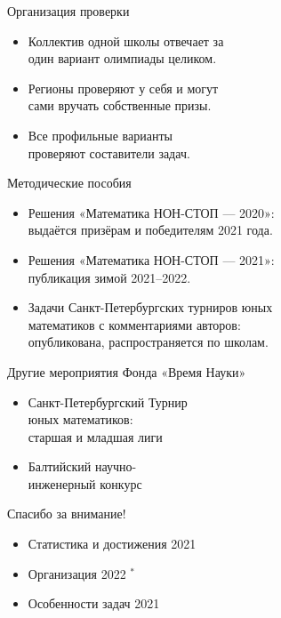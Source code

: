 \documentclass[17pt]{extarticle}
\newcommand{\newslide}[1]{\newpage \begin{center} \large #1 \end{center}}
\begin{document}
\newslide{Организация проверки}

\begin{itemize}
	\item Коллектив одной школы отвечает за\\
	один вариант олимпиады целиком.
	\item Регионы проверяют у себя и могут\\
	сами вручать собственные призы.
	\item Все профильные варианты\\
	проверяют составители задач.
\end{itemize}



\newslide{Методические пособия}

\begin{itemize}
	\item Решения «Математика НОН-СТОП — 2020»:\\ выдаётся призёрам и победителям 2021 года.
	\item Решения «Математика НОН-СТОП — 2021»:\\ публикация зимой 2021–2022.
	\item Задачи Санкт-Петербургских турниров юных\\
	математиков с комментариями авторов:\\
	опубликована, распространяется по школам.
\end{itemize}

\newslide{Другие мероприятия Фонда «Время Науки»}

\begin{itemize}
	\item Санкт-Петербургский Турнир \\
		юных математиков: \\
		старшая и младшая лиги
	\item Балтийский научно- \\
		инженерный конкурс
\end{itemize}

\newpage \begin{center} \Large Спасибо за внимание! \end{center}

\begin{itemize}
	\item Статистика и достижения 2021
	\item Организация 2022 $^*$
	\item Особенности задач 2021
\end{itemize}
\end{document}
